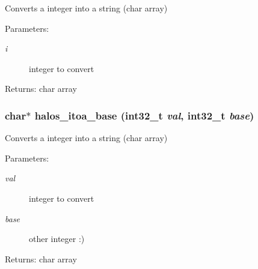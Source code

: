 Converts a integer into a string (char array) \begin{Desc}
\item[Parameters:]
\begin{description}
\item[{\em i}]integer to convert \end{description}
\end{Desc}
\begin{Desc}
\item[Returns:]char array \end{Desc}
\hypertarget{group___u_t_i_l_i_t_y_s_gb12af2d83412a582fc6ee7805cd64e94}{
\subsubsection[{halos\_\-itoa\_\-base}]{\setlength{\rightskip}{0pt plus 5cm}char$\ast$ halos\_\-itoa\_\-base (int32\_\-t {\em val}, \/  int32\_\-t {\em base})}}
\label{group___u_t_i_l_i_t_y_s_gb12af2d83412a582fc6ee7805cd64e94}


Converts a integer into a string (char array) \begin{Desc}
\item[Parameters:]
\begin{description}
\item[{\em val}]integer to convert \item[{\em base}]other integer :) \end{description}
\end{Desc}
\begin{Desc}
\item[Returns:]char array \end{Desc}
